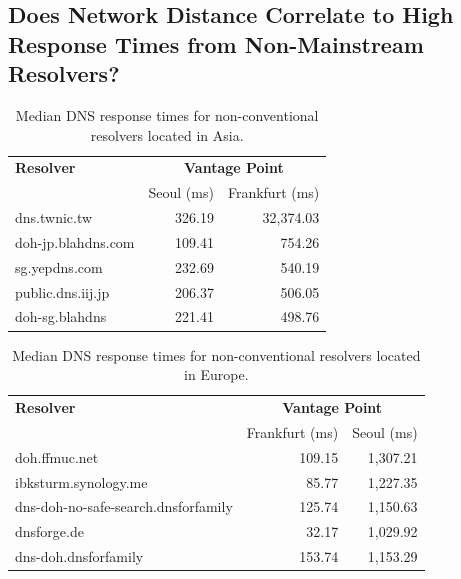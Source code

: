 \subsection{Does Network Distance Correlate to High Response Times from Non-Mainstream Resolvers?}
\begin{table}[t!]
\centering
\begin{tabular}{l|rr}
\toprule
    \textbf{Resolver} & \multicolumn{2}{c}{\textbf{Vantage Point}} \\
                  & \textrm{Seoul (ms)}         & \textrm{Frankfurt (ms)} \\
\midrule
dns.twnic.tw                                & 326.19 & 32,374.03                            \\
doh-jp.blahdns.com                          & 109.41                                           & 754.26                              \\
sg.yepdns.com                               & 232.69                                           & 540.19                              \\
public.dns.iij.jp                           & 206.37                                           & 506.05                              \\
doh-sg.blahdns                              & 221.41                                           & 498.76                              \\
\bottomrule
\end{tabular}
\caption{Median DNS response times for non-conventional resolvers located in Asia.}
\label{tab:UnconvAsia}
\end{table}

\begin{table}[t!]
\centering
\begin{tabular}{l|rr}
\toprule
\textbf{Resolver} & \multicolumn{2}{c}{\textbf{Vantage Point}} \\
                  & \textrm{Frankfurt (ms)}     & \textrm{Seoul (ms)} \\
\midrule
doh.ffmuc.net                               & 109.15 & 1,307.21                         \\
ibksturm.synology.me                        & 85.77 & 1,227.35                         \\
dns-doh-no-safe-search.dnsforfamily         & 125.74 & 1,150.63                         \\
dnsforge.de                                 & 32.17 & 1,029.92                         \\
dns-doh.dnsforfamily                        & 153.74 & 1,153.29                         \\
\bottomrule
\end{tabular}
\caption{Median DNS response times for non-conventional resolvers located in Europe.}
\label{tab:UnconvEur}
\end{table}

